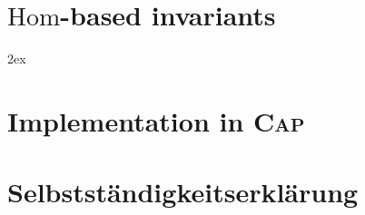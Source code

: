 \documentclass[a4paper,12pt,twoside]{article}
\begin{document}
\section{$\mathrm{Hom}$-based invariants}






\cleardoublepage
{}
\begingroup
     \parindent 0pt
     \parskip 2ex
     \def\enotesize{\normalsize}
     \theendnotes
\endgroup 

\cleardoublepage
{}


\appendix
\renewcommand{\thesection}{\Alph{section}}
\section{Implementation in \textsc{Cap}}


\cleardoublepage
\section{Selbstst\"andigkeitserkl\"arung}

\end{document}
